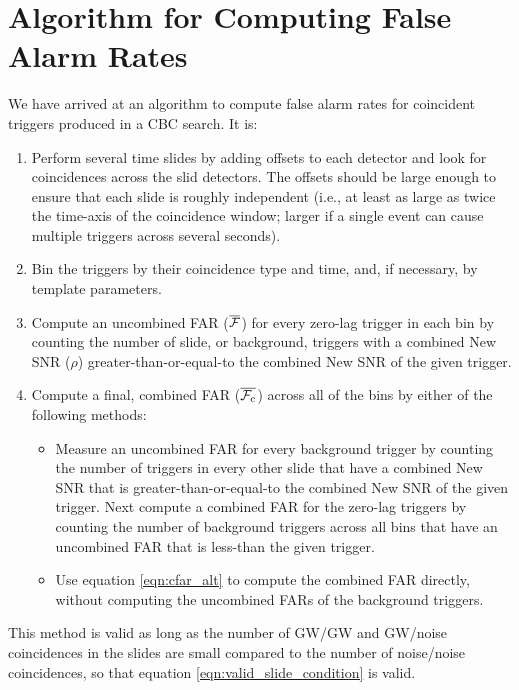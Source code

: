 \section{Algorithm for Computing False Alarm Rates}
\label{sec:far_slide_algorithm}
We have arrived at an algorithm to compute false alarm rates for coincident triggers produced in a \ac{CBC} search. It is:

\begin{enumerate}
\item{Perform several time slides by adding offsets to each detector and look for coincidences across the slid detectors. The offsets should be large enough to ensure that each slide is roughly independent (i.e., at least as large as twice the time-axis of the coincidence window; larger if a single event can cause multiple triggers across several seconds).}
\item{Bin the triggers by their coincidence type and time, and, if necessary, by template parameters.}
\item{Compute an uncombined \ac{FAR} ($\overline{\mathcal{F}}$) for every zero-lag trigger in each bin by counting the number of slide, or background, triggers with a combined New \ac{SNR} ($\rho$) greater-than-or-equal-to the combined New \ac{SNR} of the given trigger.}
\item{Compute a final, combined \ac{FAR} ($\overline{\mathcal{F}_{\mathrm{c}}}$) across all of the bins by either of the following methods:
    \begin{itemize}
    \item{Measure an uncombined \ac{FAR} for every background trigger by counting the number of triggers in every other slide that have a combined New \ac{SNR} that is greater-than-or-equal-to the combined New \ac{SNR} of the given trigger. Next compute a combined \ac{FAR} for the zero-lag triggers by counting the number of background triggers across all bins that have an uncombined \ac{FAR} that is less-than the given trigger.}
    \item{Use equation \ref{eqn:cfar_alt} to compute the combined \ac{FAR} directly, without computing the uncombined \acp{FAR} of the background triggers.}
    \end{itemize}}
\end{enumerate}
This method is valid as long as the number of \ac{GW}/\ac{GW} and \ac{GW}/noise coincidences in the slides are small compared to the number of noise/noise coincidences, so that equation \ref{eqn:valid_slide_condition} is valid.

